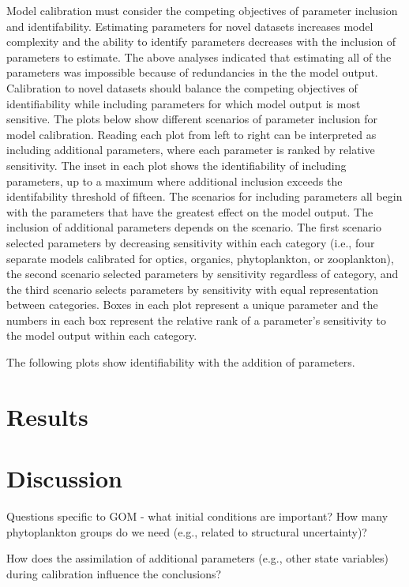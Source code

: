 \documentclass[letterpaper,12pt,oneside]{article}\usepackage[]{graphicx}\usepackage[]{color}
\begin{document}
Model calibration must consider the competing objectives of parameter inclusion and identifability.  Estimating parameters for novel datasets increases model complexity and the ability to identify parameters decreases with the inclusion of parameters to estimate.  The above analyses indicated that estimating all of the parameters was impossible because of redundancies in the the model output.  Calibration to novel datasets should balance the competing objectives of identifiability while including parameters for which model output is most sensitive.  The plots below show different scenarios of parameter inclusion for model calibration.  Reading each plot from left to right can be interpreted as including additional parameters, where each parameter is ranked by relative sensitivity.  The inset in each plot shows the identifiability of including parameters, up to a maximum where additional inclusion exceeds the identifability threshold of fifteen.  The scenarios for including parameters all begin with the parameters that have the greatest effect on the model output.  The inclusion of additional parameters depends on the scenario.  The first scenario selected parameters by decreasing sensitivity within each category (i.e., four separate models calibrated for optics, organics, phytoplankton, or zooplankton), the second scenario selected parameters by sensitivity regardless of category, and the third scenario selects parameters by sensitivity with equal representation between categories.  Boxes in each plot represent a unique parameter and the numbers in each box represent the relative rank of a parameter's sensitivity to the model output within each category. 

The following plots show identifiability with the addition of parameters. 


\section{Results}

\section{Discussion}

Questions specific to GOM - what initial conditions are important? How many phytoplankton groups do we need (e.g., related to structural uncertainty)?

How does the assimilation of additional parameters (e.g., other state variables) during calibration influence the conclusions?
\end{document}
